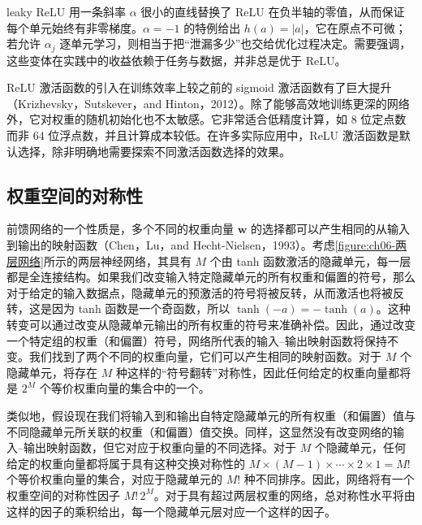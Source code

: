 \documentclass[../../main.tex]{subfiles}
\begin{document}
\begin{remark}leaky ReLU 用一条斜率 $\alpha$ 很小的直线替换了 ReLU 在负半轴的零值，从而保证每个单元始终有非零梯度。$\alpha=-1$ 的特例给出 $h(a)=|a|$，它在原点不可微；若允许 $\alpha_j$ 逐单元学习，则相当于把“泄漏多少”也交给优化过程决定。需要强调，这些变体在实践中的收益依赖于任务与数据，并非总是优于 ReLU。
\end{remark}

ReLU 激活函数的引入在训练效率上较之前的 sigmoid 激活函数有了巨大提升（Krizhevsky，Sutskever，and Hinton，2012）。除了能够高效地训练更深的网络外，它对权重的随机初始化也不太敏感。它非常适合低精度计算，如 $8$ 位定点数而非 $64$ 位浮点数，并且计算成本较低。在许多实际应用中，ReLU 激活函数是默认选择，除非明确地需要探索不同激活函数选择的效果。

\subsection{权重空间的对称性}\label{subsection:ch06-权重空间的对称性}

前馈网络的一个性质是，多个不同的权重向量 $\boldsymbol{w}$ 的选择都可以产生相同的从输入到输出的映射函数（Chen，Lu，and Hecht-Nielsen，1993）。考虑\cref{figure:ch06-两层网络}所示的两层神经网络，其具有 $M$ 个由 tanh 函数激活的隐藏单元，每一层都是全连接结构。如果我们改变输入特定隐藏单元的所有权重和偏置的符号，那么对于给定的输入数据点，隐藏单元的预激活的符号将被反转，从而激活也将被反转，这是因为 tanh 函数是一个奇函数，所以 $\tanh(-a)=-\tanh(a)$。这种转变可以通过改变从隐藏单元输出的所有权重的符号来准确补偿。因此，通过改变一个特定组的权重（和偏置）符号，网络所代表的输入--输出映射函数将保持不变。我们找到了两个不同的权重向量，它们可以产生相同的映射函数。对于 $M$ 个隐藏单元，将存在 $M$ 种这样的“符号翻转”对称性，因此任何给定的权重向量都将是 $2^{M}$ 个等价权重向量的集合中的一个。

类似地，假设现在我们将输入到和输出自特定隐藏单元的所有权重（和偏置）值与不同隐藏单元所关联的权重（和偏置）值交换。同样，这显然没有改变网络的输入--输出映射函数，但它对应于权重向量的不同选择。对于 $M$ 个隐藏单元，任何给定的权重向量都将属于具有这种交换对称性的 $M\times(M-1)\times\cdots\times2\times1=M!$ 个等价权重向量的集合，对应于隐藏单元的 $M!$ 种不同排序。因此，网络将有一个权重空间的对称性因子 $M!\,2^{M}$。对于具有超过两层权重的网络，总对称性水平将由这样的因子的乘积给出，每一个隐藏单元层对应一个这样的因子。
\end{document}
